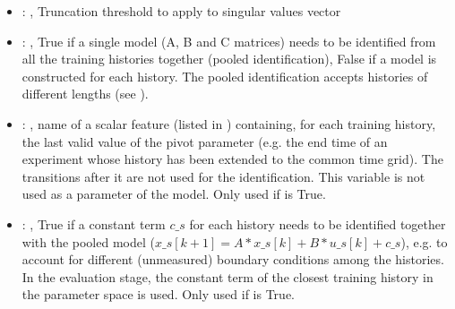 \begin{itemize}
    \item {}: ,
      Truncation threshold to apply to singular values vector

    \item {}: ,
      True if a single model (A, B and C matrices) needs to be identified
      from all the training histories together (pooled identification), False if a
      model is constructed for each history. The pooled identification accepts
      histories of different lengths (see ).

    \item {}: ,
      name of a scalar feature (listed in ) containing,
      for each training history, the last valid value of the pivot parameter (e.g.
      the end time of an experiment whose history has been extended to the common
      time grid). The transitions after it are not used for the identification.
      This variable is not used as a parameter of the model.
      Only used if  is True.

    \item {}: ,
      True if a constant term $c\_s$ for each history needs to be
      identified together with the pooled model ($x\_s[k+1]=A*x\_s[k]+B*u\_s[k]+c\_s$),
      e.g. to account for different (unmeasured) boundary conditions among the
      histories. In the evaluation stage, the constant term of the closest
      training history in the parameter space is used. Only used if
       is True.
  \end{itemize}

